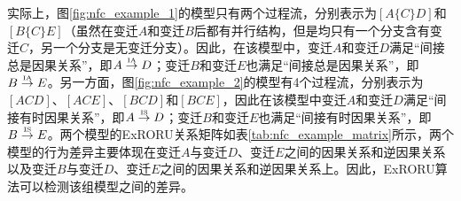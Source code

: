 实际上，图\ref{fig:nfc_example_1}的模型只有两个过程流，分别表示为$[A\{C\}D]$和$[B\{C\}E]$（虽然在变迁$A$和变迁$B$后都有并行结构，但是均只有一个分支含有变迁$C$，另一个分支是无变迁分支）。因此，在该模型中，变迁$A$和变迁$D$满足“间接总是因果关系”，即$A\overset{\text{\tiny{IA}}}{\rightarrow}D$；变迁$B$和变迁$E$也满足“间接总是因果关系”，即$B\overset{\text{\tiny{IA}}}{\rightarrow}E$。另一方面，图\ref{fig:nfc_example_2}的模型有4个过程流，分别表示为$[ACD]$、$[ACE]$、$[BCD]$和$[BCE]$，因此在该模型中变迁$A$和变迁$D$满足“间接有时因果关系”，即$A\overset{\text{\tiny{IS}}}{\rightarrow}D$；变迁$B$和变迁$E$也满足“间接有时因果关系”，即$B\overset{\text{\tiny{IS}}}{\rightarrow}E$。两个模型的ExRORU关系矩阵如表\ref{tab:nfc_example_matrix}所示，两个模型的行为差异主要体现在变迁$A$与变迁$D$、变迁$E$之间的因果关系和逆因果关系以及变迁$B$与变迁$D$、变迁$E$之间的因果关系和逆因果关系上。因此，ExRORU算法可以检测该组模型之间的差异。

